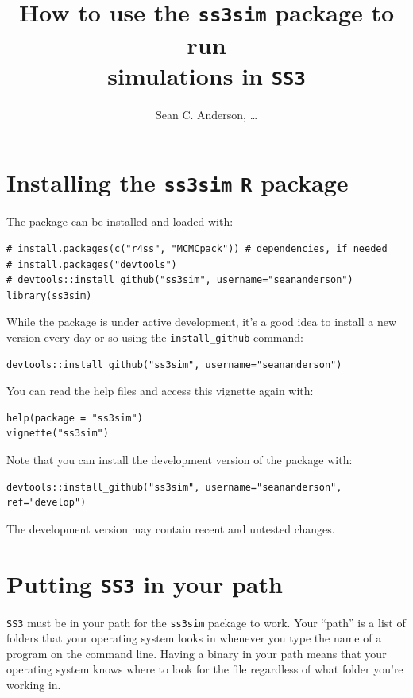 \documentclass[12pt]{article}
\title{How to use the \texttt{ss3sim} package to run\\simulations in \texttt{SS3}}
\author{Sean C. Anderson, \ldots}
\date{}
\begin{document}
\maketitle

\section{Installing the \texttt{ss3sim} \texttt{R} package}

The package can be installed and loaded with:

\begin{verbatim}
# install.packages(c("r4ss", "MCMCpack")) # dependencies, if needed
# install.packages("devtools")
# devtools::install_github("ss3sim", username="seananderson")
library(ss3sim)
\end{verbatim}

\noindent
While the package is under active development, it's a good idea to install a 
new version every day or so using the \texttt{install\_github} command:

\begin{verbatim}
devtools::install_github("ss3sim", username="seananderson")
\end{verbatim}

\noindent
You can read the help files and access this vignette again with:

\begin{verbatim}
help(package = "ss3sim")
vignette("ss3sim")
\end{verbatim}

\noindent
Note that you can install the development version of the package with:

\begin{verbatim}
devtools::install_github("ss3sim", username="seananderson", ref="develop")
\end{verbatim}

\noindent
The development version may contain recent and untested changes.

\section{Putting \texttt{SS3} in your path}
\texttt{SS3} must be in your path for the \texttt{ss3sim} package to work. Your 
``path'' is a list of folders that your operating system looks in whenever you 
type the name of a program on the command line. Having a binary in your path 
means that your operating system knows where to look for the file regardless of 
what folder you're working in. 
\end{document}
